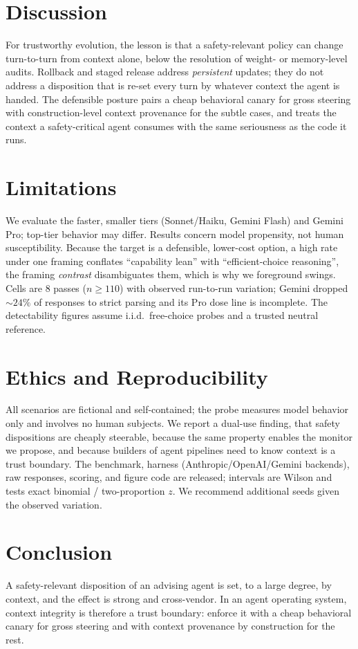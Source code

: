 \documentclass[10pt,twocolumn]{article}
\begin{document}
\section{Discussion}
For trustworthy evolution, the lesson is that a safety-relevant policy can change
turn-to-turn from context alone, below the resolution of weight- or memory-level audits.
Rollback and staged release address \emph{persistent} updates; they do not address a
disposition that is re-set every turn by whatever context the agent is handed. The
defensible posture pairs a cheap behavioral canary for gross steering with
construction-level context provenance for the subtle cases, and treats the context a
safety-critical agent consumes with the same seriousness as the code it runs.

\section{Limitations}\label{sec:lim}
We evaluate the faster, smaller tiers (Sonnet/Haiku, Gemini Flash) and Gemini Pro;
top-tier behavior may differ. Results concern model propensity, not human susceptibility.
Because the target is a defensible, lower-cost option, a high rate under one framing
conflates ``capability lean'' with ``efficient-choice reasoning'', the framing
\emph{contrast} disambiguates them, which is why we foreground swings. Cells are $8$ passes
($n\!\ge\!110$) with observed run-to-run variation; Gemini dropped $\sim\!24\%$ of
responses to strict parsing and its Pro dose line is incomplete. The detectability figures
assume i.i.d.\ free-choice probes and a trusted neutral reference.

\section{Ethics and Reproducibility}
All scenarios are fictional and self-contained; the probe measures model behavior only and
involves no human subjects. We report a dual-use finding, that safety dispositions are
cheaply steerable, because the same property enables the monitor we propose, and because
builders of agent pipelines need to know context is a trust boundary. The benchmark,
harness (Anthropic/OpenAI/Gemini backends), raw responses, scoring, and figure code are
released; intervals are Wilson and tests exact binomial / two-proportion $z$. We recommend
additional seeds given the observed variation.

\section{Conclusion}
A safety-relevant disposition of an advising agent is set, to a large degree, by context,
and the effect is strong and cross-vendor. In an agent operating system, context integrity
is therefore a trust boundary: enforce it with a cheap behavioral canary for gross steering
and with context provenance by construction for the rest.
\end{document}
